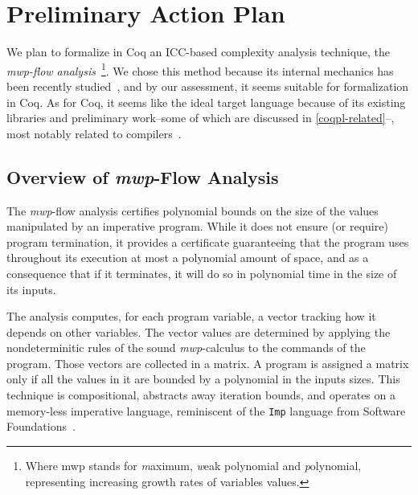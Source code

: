 \tocless\section{Preliminary Action Plan}  %

We plan to formalize in Coq an ICC-based complexity analysis technique, the \emph{mwp-flow analysis}~\cite{jones2009}\footnote{Where mwp stands for \emph{m}aximum, \emph{w}eak polynomial and \emph{p}olynomial, representing increasing growth rates of variables values.}.
We chose this method because its internal mechanics has been recently studied~\cite{aubert20222}, and by our assessment, it seems suitable for formalization in Coq.
As for Coq, it seems like the ideal target language because of its existing libraries and preliminary work--some of which are discussed in \autoref{coqpl-related}--, most notably related to compilers~\cite{leroy2009}.

\tocless\subsection{Overview of \emph{mwp}-Flow Analysis}

The \emph{mwp}-flow analysis certifies polynomial bounds on the size of the values manipulated by
an imperative program.
While it does not ensure (or require) program termination, it provides a certificate guaranteeing that the program uses throughout its execution at
most a polynomial amount of space, and as a consequence that if it terminates, it will do so in polynomial time in the size of its inputs.

The analysis computes, for each program variable, a vector tracking how it depends on other variables.
The vector values are determined by applying the nondeterminitic rules of the sound \emph{mwp}-calculus to the commands of the program.
Those vectors are collected in a matrix.
A program is assigned a matrix only if all the values in it are bounded by a polynomial in the inputs sizes.
This technique is compositional, abstracts away \eg iteration bounds, and operates on
a memory-less imperative language, reminiscent of the \texttt{Imp} language from Software Foundations~\cite%
{cpierce20221}.


